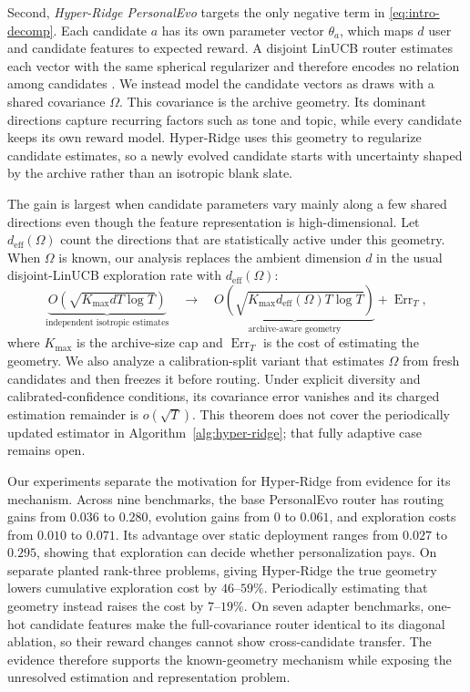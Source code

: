 \documentclass{article} %
\begin{document}
Second, \emph{Hyper-Ridge PersonalEvo} targets the only negative term in \eqref{eq:intro-decomp}. Each candidate $a$ has its own parameter vector $\theta_a$, which maps $d$ user and candidate features to expected reward. A disjoint LinUCB router estimates each vector with the same spherical regularizer and therefore encodes no relation among candidates \citep{abbasi2011oful,chu2011linucb}. We instead model the candidate vectors as draws with a shared covariance $\Omega$. This covariance is the archive geometry. Its dominant directions capture recurring factors such as tone and topic, while every candidate keeps its own reward model. Hyper-Ridge uses this geometry to regularize candidate estimates, so a newly evolved candidate starts with uncertainty shaped by the archive rather than an isotropic blank slate.

The gain is largest when candidate parameters vary mainly along a few shared directions even though the feature representation is high-dimensional. Let $d_{\mathrm{eff}}(\Omega)$ count the directions that are statistically active under this geometry. When $\Omega$ is known, our analysis replaces the ambient dimension $d$ in the usual disjoint-LinUCB exploration rate with $d_{\mathrm{eff}}(\Omega)$:
\begin{equation}
\label{eq:intro-hyper-cost}
\underbrace{O\!\left(\sqrt{K_{\max}dT\log T}\right)}_{\text{independent isotropic estimates}}
\quad\longrightarrow\quad
\underbrace{O\!\left(\sqrt{K_{\max}d_{\mathrm{eff}}(\Omega)T\log T}\right)}_{\text{archive-aware geometry}}
+
\operatorname{Err}_T ,
\end{equation}
where $K_{\max}$ is the archive-size cap and $\operatorname{Err}_T$ is the cost of estimating the geometry. We also analyze a calibration-split variant that estimates $\Omega$ from fresh candidates and then freezes it before routing. Under explicit diversity and calibrated-confidence conditions, its covariance error vanishes and its charged estimation remainder is $o(\sqrt{T})$. This theorem does not cover the periodically updated estimator in Algorithm~\ref{alg:hyper-ridge}; that fully adaptive case remains open.

Our experiments separate the motivation for Hyper-Ridge from evidence for its mechanism. Across nine benchmarks, the base PersonalEvo router has routing gains from $0.036$ to $0.280$, evolution gains from $0$ to $0.061$, and exploration costs from $0.010$ to $0.071$. Its advantage over static deployment ranges from $0.027$ to $0.295$, showing that exploration can decide whether personalization pays. On separate planted rank-three problems, giving Hyper-Ridge the true geometry lowers cumulative exploration cost by $46$--$59\%$. Periodically estimating that geometry instead raises the cost by $7$--$19\%$. On seven adapter benchmarks, one-hot candidate features make the full-covariance router identical to its diagonal ablation, so their reward changes cannot show cross-candidate transfer. The evidence therefore supports the known-geometry mechanism while exposing the unresolved estimation and representation problem.
\end{document}
